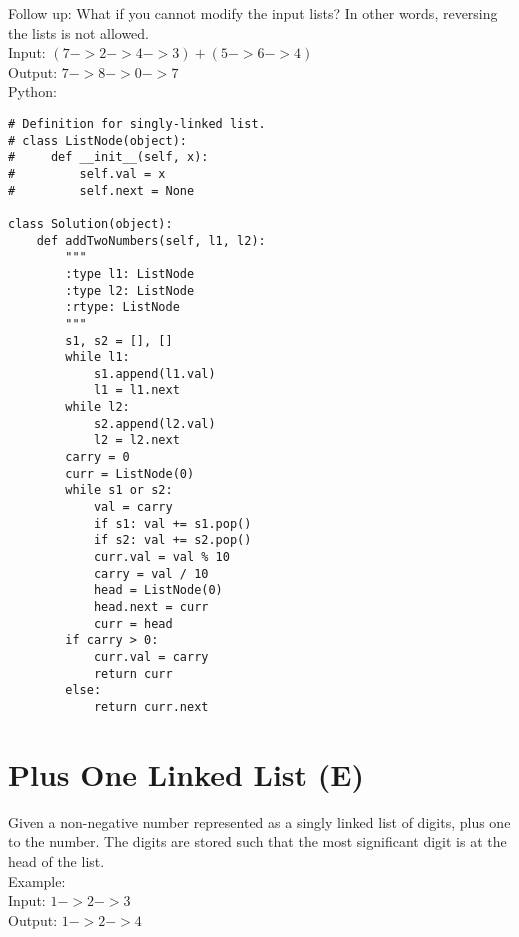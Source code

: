 Follow up:
What if you cannot modify the input lists? In other words, reversing the lists is not allowed. \\

Input: $(7 -> 2 -> 4 -> 3) + (5 -> 6 -> 4)$ \\
Output: $7 -> 8 -> 0 -> 7$\\

Python:
\lstset{language=python}
\begin{lstlisting}
# Definition for singly-linked list.
# class ListNode(object):
#     def __init__(self, x):
#         self.val = x
#         self.next = None

class Solution(object):
    def addTwoNumbers(self, l1, l2):
        """
        :type l1: ListNode
        :type l2: ListNode
        :rtype: ListNode
        """
        s1, s2 = [], []
        while l1:
            s1.append(l1.val)
            l1 = l1.next
        while l2:
            s2.append(l2.val)
            l2 = l2.next
        carry = 0
        curr = ListNode(0)
        while s1 or s2:
            val = carry
            if s1: val += s1.pop()
            if s2: val += s2.pop()
            curr.val = val % 10
            carry = val / 10
            head = ListNode(0)
            head.next = curr
            curr = head
        if carry > 0:
            curr.val = carry
            return curr
        else:
            return curr.next
\end{lstlisting}

\section{Plus One Linked List (E)}
Given a non-negative number represented as a singly linked list of digits, plus one to the number. The digits are stored such that the most significant digit is at the head of the list.\\

Example:\\
Input: $1->2->3$\\
Output: $1->2->4$\\

